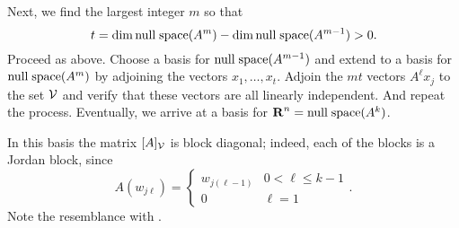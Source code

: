 Next, we find the largest integer $m$ so that 
\[
t=\dim{\rm null\;space}(A^m)-\dim{\rm null\;space}(A^{m-1})>0.
\]
Proceed as above.  Choose a basis for ${\rm null\;space}(A^{m-1})$ and extend to a basis 
for ${\rm null\;space}(A^m)$ by adjoining the vectors $x_1,\ldots,x_t$.  Adjoin the $mt$ 
vectors $A^\ell x_j$ to the set ${\cal V}$ and verify that these vectors are 
all linearly independent.  And repeat the process.  Eventually, we arrive at 
a basis for $\mbox{$\bf{R}$}^n={\rm null\;space}(A^k)$.  

In this basis the matrix $[A]_{\cal V}$ is block diagonal; indeed, each of 
the blocks is a Jordan block, since 
\[
A(w_{j\ell}) = \left\{\begin{array}{cl}w_{j(\ell-1)} & 0<\ell\le k-1\\ 0 & 
\ell=1 \end{array}\right. .
\]
Note the resemblance with .


